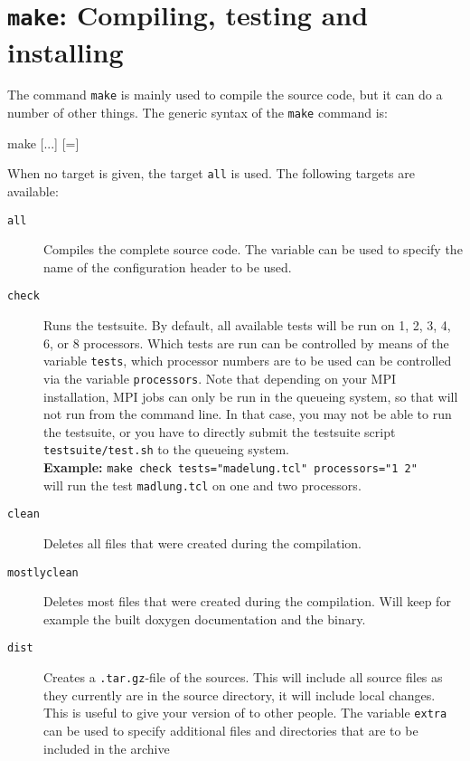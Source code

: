 \section{\texttt{make}: Compiling,  testing and installing \es}
\label{sec:make}

The command \texttt{make} is mainly used to compile the \es{} source
code, but it can do a number of other things. The generic syntax of
the \texttt{make} command is:
\begin{code}
make [...] [=]
\end{code}
When no target is given, the target \texttt{all} is used. The
following targets are available:
\begin{description}
\item[\texttt{all}] Compiles the complete \es source code. The
  variable  can be used to specify the name of the
  configuration header to be used.
\item[\texttt{check}] Runs the testsuite. By default, all available
  tests will be run on 1, 2, 3, 4, 6, or 8 processors. Which tests are
  run can be controlled by means of the variable \texttt{tests}, which
  processor numbers are to be used can be controlled via the variable
  \texttt{processors}. Note that depending on your MPI installation,
  MPI jobs can only be run in the queueing system, so that \es{} will
  not run from the command line. In that case, you may not be able to
  run the testsuite, or you have to directly submit the testsuite script
  \verb!testsuite/test.sh! to the queueing system.\\
  \textbf{Example:} \verb!make check tests="madelung.tcl" processors="1 2"!\\
  will run the test \texttt{madlung.tcl} on one and two processors.
\item[\texttt{clean}] Deletes all files that were created during the
  compilation.
\item[\texttt{mostlyclean}] Deletes most files that were created
  during the compilation. Will keep for example the built doxygen
  documentation and the \es{} binary.
\item[\texttt{dist}] Creates a \texttt{.tar.gz}-file of the \es{}
  sources.  This will include all source files as they currently are
  in the source directory, \ie{} it will include local changes.  This
  is useful to give your version of \es{} to other people.
  The variable \texttt{extra} can be used to specify additional
  files and directories that are to be included in the archive

\end{description}

